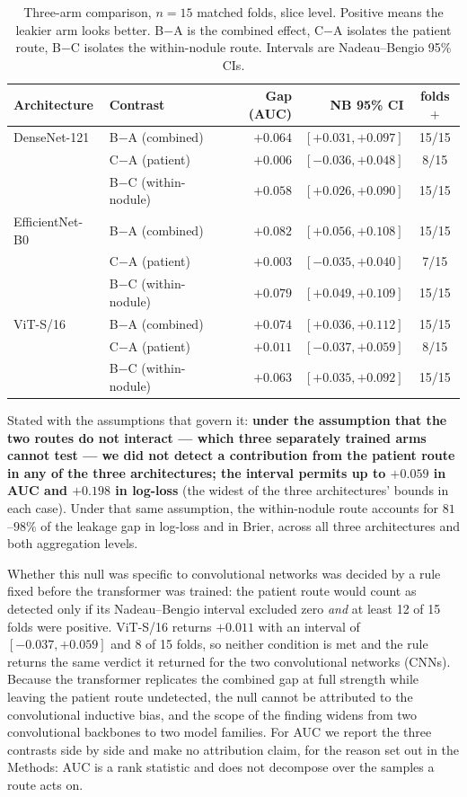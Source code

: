 \documentclass{ieeeaccess}
\begin{document}
\begin{table}[t]
\centering
\caption{Three-arm comparison, $n=15$ matched folds, slice level. Positive means the leakier arm
looks better. B$-$A is the combined effect, C$-$A isolates the patient route, B$-$C isolates the
within-nodule route. Intervals are Nadeau--Bengio 95\% CIs.}
\label{tab:routes}
\small
\begin{tabular}{llrrc}
\hline
Architecture & Contrast & Gap (AUC) & NB 95\% CI & folds$+$ \\
\hline
DenseNet-121 & B$-$A (combined)      & $+0.064$ & $[+0.031, +0.097]$ & 15/15 \\
             & C$-$A (patient)       & $+0.006$ & $[-0.036, +0.048]$ & 8/15 \\
             & B$-$C (within-nodule) & $+0.058$ & $[+0.026, +0.090]$ & 15/15 \\
EfficientNet-B0 & B$-$A (combined)      & $+0.082$ & $[+0.056, +0.108]$ & 15/15 \\
             & C$-$A (patient)       & $+0.003$ & $[-0.035, +0.040]$ & 7/15 \\
             & B$-$C (within-nodule) & $+0.079$ & $[+0.049, +0.109]$ & 15/15 \\
ViT-S/16     & B$-$A (combined)      & $+0.074$ & $[+0.036, +0.112]$ & 15/15 \\
             & C$-$A (patient)       & $+0.011$ & $[-0.037, +0.059]$ & 8/15 \\
             & B$-$C (within-nodule) & $+0.063$ & $[+0.035, +0.092]$ & 15/15 \\
\hline
\end{tabular}
\end{table}

Stated with the assumptions that govern it: \textbf{under the assumption that the two routes do not
interact --- which three separately trained arms cannot test --- we did not detect a contribution
from the patient route in any of the three architectures; the interval permits up to $+0.059$ in AUC
and $+0.198$ in log-loss} (the widest of the three architectures' bounds in each case). Under that
same assumption, the within-nodule route accounts for $81$--$98\%$ of the leakage gap in log-loss
and in Brier, across all three architectures and both aggregation levels.

Whether this null was specific to convolutional networks was decided by a rule fixed before the
transformer was trained: the patient route would count as detected only if its Nadeau--Bengio
interval excluded zero \emph{and} at least 12 of 15 folds were positive. ViT-S/16 returns $+0.011$
with an interval of $[-0.037, +0.059]$ and 8 of 15 folds, so neither condition is met and the rule
returns the same verdict it returned for the two convolutional networks (CNNs). Because the transformer replicates the
combined gap at full strength while leaving the patient route undetected, the null cannot be
attributed to the convolutional inductive bias, and the scope of the finding widens from two
convolutional backbones to two model families. For AUC we report the three contrasts
side by side and make no attribution claim, for the reason set out in the Methods: AUC is a rank
statistic and does not decompose over the samples a route acts on.
\end{document}
